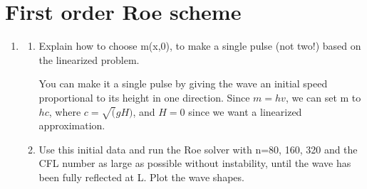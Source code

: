 

\section{First order Roe scheme} 

\label{sec:first_order_roe_scheme} 
\begin{enumerate}
	\item 
	\begin{enumerate}
		\item Explain how to choose m(x,0), to make a single pulse (not two!) based on the linearized problem. 
		
		You can make it a single pulse by giving the wave an initial speed proportional to its height in one direction. Since $m=hv$, we can set m to $hc$, where $c=\sqrt(gH)$, and $H=0$ since we want a linearized approximation.
		
		\item Use this initial data and run the Roe solver with n=80, 160, 320 and the CFL number as large as possible without instability, until the wave has been fully reflected at L. Plot the wave shapes. 
		

\end{enumerate}
\end{enumerate}
